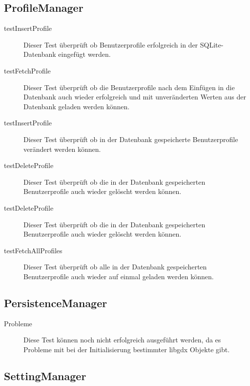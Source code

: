 \subsection{ProfileManager}

\begin{description}

\item[testInsertProfile]
Dieser Test überprüft ob Benutzerprofile erfolgreich in der SQLite-Datenbank eingefügt werden. 

\item[testFetchProfile]
Dieser Test überprüft ob die Benutzerprofile nach dem Einfügen in die Datenbank auch wieder erfolgreich und mit unveränderten Werten aus der Datenbank geladen werden können.

\item[testInsertProfile]
Dieser Test überprüft ob in der Datenbank gespeicherte Benutzerprofile verändert werden können.

\item[testDeleteProfile]
Dieser Test überprüft ob die in der Datenbank gespeicherten Benutzerprofile auch wieder gelöscht werden können.

\item[testDeleteProfile]
Dieser Test überprüft ob die in der Datenbank gespeicherten Benutzerprofile auch wieder gelöscht werden können.

\item[testFetchAllProfiles]
Dieser Test überprüft ob alle in der Datenbank gespeicherten Benutzerprofile auch wieder auf einmal geladen werden können.

\end{description}


\subsection{PersistenceManager}

\begin{description}

\item[Probleme]
Diese Test können noch nicht erfolgreich ausgeführt werden, da es Probleme mit bei der Initialisierung bestimmter libgdx Objekte gibt.

\end{description}

\subsection{SettingManager}

